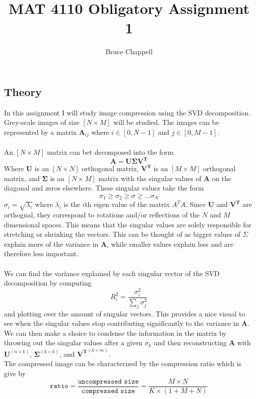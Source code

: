 \documentclass[11pt]{article}
\begin{document}
\author{Bruce Chappell}
\title{MAT 4110 Obligatory Assignment 1}
\maketitle

\medskip

\begin{enumerate}
\section{Theory}
In this assignment I will study image compression using the SVD decomposition. Grey-scale images of size $[N \times M]$ will be studied. The images can be represented by a matrix $\bm{A}_{ij}$ where $i \in [0,N-1]$ and $j \in [0,M-1]$. \\
\\
An $[N \times M]$ matrix can bet decomposed into the form
\begin{equation}
    \bm{A} = \bm{U\Sigma V^{T}}
\end{equation}
Where $\bm{U}$ is an $[N \times N]$ orthogonal matrix, $\bm{V^{T}}$ is an $[M \times M]$ orthogonal matrix, and $\bm{\Sigma}$ is an $[N \times M]$ matrix with the singular values of $\bm{A}$ on the diagonal and zeros elsewhere. These singular values take the form
\begin{equation}
    \sigma_1 \geq \sigma_2 \geq \sigma \geq \dots \sigma_{N}
\end{equation}
$\sigma_i = \sqrt{\lambda_i}$ where $\lambda_i$ is the $i$th eigen value of the matrix $A^T A$. Since $\bm{U}$ and $\bm{V^T}$ are orthognal, they correspond to rotations and/or reflections of the $N$ and $M$ dimensional spaces. This means that the singular values are solely responsible for stretching or shrinking the vectors. This can be thought of as bigger values of $\Sigma$ explain more of the variance in $\bm{A}$, while smaller values explain less and are therefore less important.
\\
\\
We can find the variance explained by each singular vector of the SVD decomposition by computing
\begin{equation}
    R_i^2 = \frac{\sigma_i^2}{\sum_j \sigma_j^2}
\end{equation}
and plotting over the amount of singular vectors. This provides a nice visual to see when the singular values stop contributing significantly to the variance in $\bm{A}$. We can then make a choice to condense the information in the matrix by throwing out the singular values after a given $\sigma_{k}$ and then reconstructing $\bm{A}$ with $\bm{U}^{(n \times k)}$, $\bm{\Sigma}^{(k \times k)}$, and $\bm{V^T}^{(k \times m)}$.
\\
The compressed image can be characterized by the compression ratio which is give by
\begin{equation}
    \texttt{ratio} = \frac{\texttt{uncompressed size}}{\texttt{compressed size}} = \frac{M\times N}{K\times(1+M+N)}
\end{equation}
\\

\end{enumerate}
\end{document}
